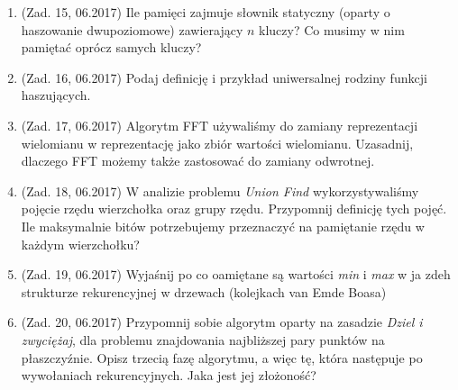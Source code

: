\documentclass[10pt]{article}%
\begin{document}
\begin{enumerate}
\item (Zad. 15, 06.2017) Ile pamięci zajmuje słownik statyczny (oparty o haszowanie dwupoziomowe) zawierający $n$ kluczy? Co musimy w nim pamiętać oprócz samych kluczy?

\item (Zad. 16, 06.2017) Podaj definicję i przykład uniwersalnej rodziny funkcji haszujących.

\item (Zad. 17, 06.2017) Algorytm FFT używaliśmy do zamiany reprezentacji wielomianu w reprezentację jako zbiór wartości wielomianu. Uzasadnij, dlaczego FFT możemy także zastosować do zamiany odwrotnej.

\item (Zad. 18, 06.2017) W analizie problemu \emph{Union Find} wykorzystywaliśmy pojęcie rzędu wierzchołka oraz grupy rzędu. Przypomnij definicję tych pojęć. Ile maksymalnie bitów potrzebujemy przeznaczyć na pamiętanie rzędu w każdym wierzchołku?

\item (Zad. 19, 06.2017) Wyjaśnij po co oamiętane są wartości \emph{min} i \emph{max} w ja zdeh strukturze rekurencyjnej w drzewach (kolejkach van Emde Boasa)

\item (Zad. 20, 06.2017) Przypomnij sobie algorytm oparty na zasadzie \emph{Dziel i zwyciężaj}, dla problemu znajdowania najbliższej pary punktów na płaszczyźnie. Opisz trzecią fazę algorytmu, a więc tę, która następuje po wywołaniach rekurencyjnych. Jaka jest jej złożoność?


\end{enumerate}
\end{document}
